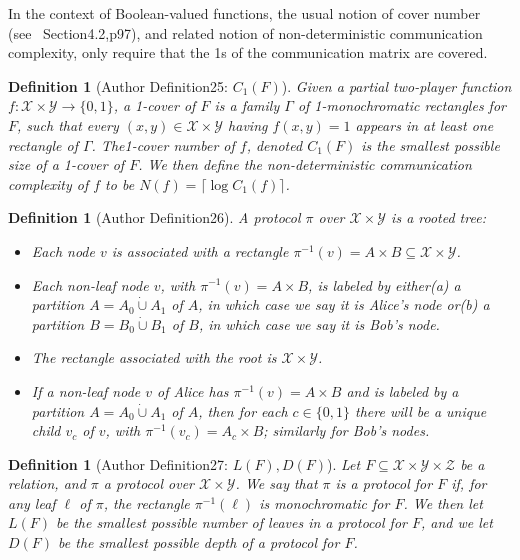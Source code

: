 \documentclass[10pt,a4paper]{article}
\newtheorem{ntdefinition}[nttheorem]{Definition}
\begin{document}
In the context of Boolean-valued functions, the usual notion of cover number (see~\cite{ref42} Section4.2,p97), and related notion of non-deterministic communication complexity, only require that the 1s of the communication matrix are covered.
\begin{ntdefinition}[Author Definition25: $C_1(F)$]
Given a partial two-player function $f:\mathcal X\times\mathcal Y\to\{0,1\}$, a 1-cover of $F$ is a family $\Gamma$ of 1-monochromatic rectangles for $F$, such that every $(x,y)\in\mathcal X\times\mathcal Y$ having $f(x,y)=1$ appears in at least one rectangle of $\Gamma$. The1-cover number of $f$, denoted $C_1(F)$ is the smallest possible size of a 1-cover of $F$. We then define the non-deterministic communication complexity of $f$ to be $N(f)=\lceil\log C_1(f)\rceil$.
\end{ntdefinition}
\begin{ntdefinition}[Author Definition26]
A protocol $\pi$ over $\mathcal X\times\mathcal Y$ is a rooted tree:
\begin{itemize}
\item Each node $v$ is associated with a rectangle $\pi^{-1}(v)=A\times B\subseteq\mathcal X\times\mathcal Y$.
\item Each non-leaf node $v$, with $\pi^{-1}(v)=A\times B$, is labeled by either(a) a partition $A=A_0\mathbin{\dot\cup}A_1$ of $A$, in which case we say it is Alice's node or(b) a partition $B=B_0\mathbin{\dot\cup}B_1$ of $B$, in which case we say it is Bob's node.
\item The rectangle associated with the root is $\mathcal X\times\mathcal Y$.
\item If a non-leaf node $v$ of Alice has $\pi^{-1}(v)=A\times B$ and is labeled by a partition $A=A_0\mathbin{\dot\cup}A_1$ of $A$, then for each $c\in\{0,1\}$ there will be a unique child $v_c$ of $v$, with $\pi^{-1}(v_c)=A_c\times B$; similarly for Bob's nodes.
\end{itemize}
\end{ntdefinition}
\begin{ntdefinition}[Author Definition27: $L(F),D(F)$]
Let $F\subseteq\mathcal X\times\mathcal Y\times\mathcal Z$ be a relation, and $\pi$ a protocol over $\mathcal X\times\mathcal Y$. We say that $\pi$ is a protocol for $F$ if, for any leaf $\ell$ of $\pi$, the rectangle $\pi^{-1}(\ell)$ is monochromatic for $F$. We then let $L(F)$ be the smallest possible number of leaves in a protocol for $F$, and we let $D(F)$ be the smallest possible depth of a protocol for $F$.
\end{ntdefinition}
\end{document}
